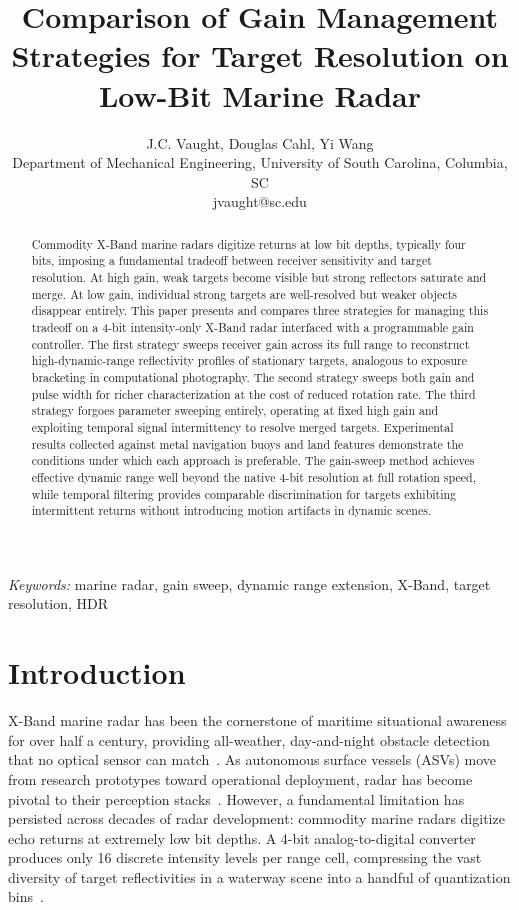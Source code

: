 \documentclass[twocolumn, 10pt]{article}
\title{Comparison of Gain Management Strategies for Target Resolution on Low-Bit Marine Radar}
\author{J.C. Vaught, Douglas Cahl, Yi Wang\\
\small Department of Mechanical Engineering, University of South Carolina, Columbia, SC\\
\small jvaught@sc.edu}
\begin{document}
\maketitle

\noindent\textit{Keywords:} marine radar, gain sweep, dynamic range extension, X-Band, target resolution, HDR

\begin{abstract}
Commodity X-Band marine radars digitize returns at low bit depths, typically four bits, imposing a fundamental tradeoff between receiver sensitivity and target resolution. At high gain, weak targets become visible but strong reflectors saturate and merge. At low gain, individual strong targets are well-resolved but weaker objects disappear entirely. This paper presents and compares three strategies for managing this tradeoff on a 4-bit intensity-only X-Band radar interfaced with a programmable gain controller. The first strategy sweeps receiver gain across its full range to reconstruct high-dynamic-range reflectivity profiles of stationary targets, analogous to exposure bracketing in computational photography. The second strategy sweeps both gain and pulse width for richer characterization at the cost of reduced rotation rate. The third strategy forgoes parameter sweeping entirely, operating at fixed high gain and exploiting temporal signal intermittency to resolve merged targets. Experimental results collected against metal navigation buoys and land features demonstrate the conditions under which each approach is preferable. The gain-sweep method achieves effective dynamic range well beyond the native 4-bit resolution at full rotation speed, while temporal filtering provides comparable discrimination for targets exhibiting intermittent returns without introducing motion artifacts in dynamic scenes.
\end{abstract}


\section{Introduction}

X-Band marine radar has been the cornerstone of maritime situational awareness for over half a century, providing all-weather, day-and-night obstacle detection that no optical sensor can match~\cite{Skolnik2001Radar}. As autonomous surface vessels (ASVs) move from research prototypes toward operational deployment, radar has become pivotal to their perception stacks~\cite{Han2020ARAGON, Chung2023Pohang}. However, a fundamental limitation has persisted across decades of radar development: commodity marine radars digitize echo returns at extremely low bit depths. A 4-bit analog-to-digital converter produces only 16 discrete intensity levels per range cell, compressing the vast diversity of target reflectivities in a waterway scene into a handful of quantization bins~\cite{Skolnik2001Radar, Richards2014Fundamentals}.
\end{document}
